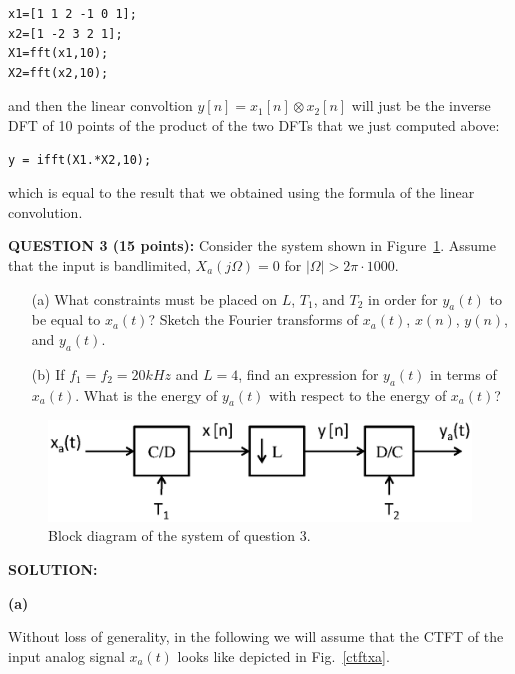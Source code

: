 \documentclass[a4paper,11pt,oneside]{article}
\begin{document}
\begin{verbatim}
x1=[1 1 2 -1 0 1];
x2=[1 -2 3 2 1];
X1=fft(x1,10);
X2=fft(x2,10);
\end{verbatim}

and then the linear convoltion $y[n]=x_1[n]\otimes x_2[n]$ will just be the inverse DFT of 10 points of the product of the two DFTs that we just computed above:

\begin{verbatim}
y = ifft(X1.*X2,10);
\end{verbatim}

which is equal to the result that we obtained using the formula of the linear convolution.


\vspace{2cm}

\textbf{QUESTION 3 (15 points):} Consider the system shown in Figure~\ref{fig2}. Assume that the input is bandlimited, $X_a(j\Omega)=0$ for $|\Omega|>2\pi\cdot 1000$.

\begin{itemize}
\item[(a)] What constraints must be placed on $L$, $T_1$, and $T_{2}$ in order for $y_a(t)$ to be equal to $x_a(t)$? Sketch the Fourier transforms of $x_a(t)$, $x(n)$, $y(n)$, and $y_a(t)$.
\item[(b)] If $f_1=f_2=20kHz$ and $L=4$, find an expression for $y_a(t)$ in terms of $x_a(t)$. What is the energy of $y_{a}(t)$ with respect to the energy of $x_{a}(t)$?
\end{itemize}

\begin{figure}[h!]
\centering
\includegraphics[width=.8\textwidth]{fig2.eps}
\caption{Block diagram of the system of question 3.}
\label{fig2}
\end{figure}



\vspace{1cm}

\textbf{SOLUTION:}

\textbf{(a)}


Without loss of generality, in the following we will assume that the CTFT of the input analog signal $x_a(t)$ looks like depicted in Fig.~\ref{ctftxa}.
\end{document}
